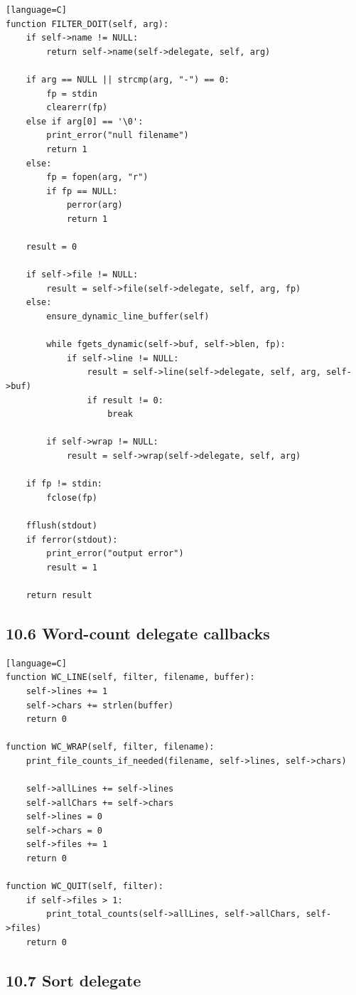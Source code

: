 \documentclass[11pt]{article}
\begin{document}
\begin{verbatim}[language=C]
function FILTER_DOIT(self, arg):
    if self->name != NULL:
        return self->name(self->delegate, self, arg)

    if arg == NULL || strcmp(arg, "-") == 0:
        fp = stdin
        clearerr(fp)
    else if arg[0] == '\0':
        print_error("null filename")
        return 1
    else:
        fp = fopen(arg, "r")
        if fp == NULL:
            perror(arg)
            return 1

    result = 0

    if self->file != NULL:
        result = self->file(self->delegate, self, arg, fp)
    else:
        ensure_dynamic_line_buffer(self)

        while fgets_dynamic(self->buf, self->blen, fp):
            if self->line != NULL:
                result = self->line(self->delegate, self, arg, self->buf)
                if result != 0:
                    break

        if self->wrap != NULL:
            result = self->wrap(self->delegate, self, arg)

    if fp != stdin:
        fclose(fp)

    fflush(stdout)
    if ferror(stdout):
        print_error("output error")
        result = 1

    return result
\end{verbatim}

\subsection{10.6 Word-count delegate
callbacks}\label{word-count-delegate-callbacks}

\begin{verbatim}[language=C]
function WC_LINE(self, filter, filename, buffer):
    self->lines += 1
    self->chars += strlen(buffer)
    return 0

function WC_WRAP(self, filter, filename):
    print_file_counts_if_needed(filename, self->lines, self->chars)

    self->allLines += self->lines
    self->allChars += self->chars
    self->lines = 0
    self->chars = 0
    self->files += 1
    return 0

function WC_QUIT(self, filter):
    if self->files > 1:
        print_total_counts(self->allLines, self->allChars, self->files)
    return 0
\end{verbatim}

\subsection{10.7 Sort delegate}\label{sort-delegate}
\end{document}
